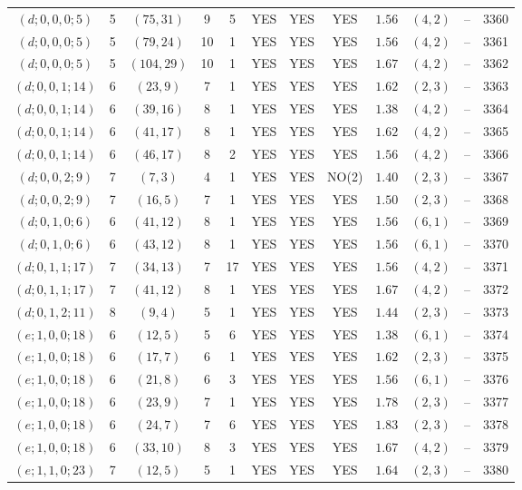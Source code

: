 \begin{longtable}{|c|c|c|c|c|c|c|c|c|c|c|c|}
$(d;0,0,0;5)$ & 5 & $(75,31)$ & 9 & 5 & YES & YES & YES & $1.56$ & $(4,2)$ & -- & 3360\\
$(d;0,0,0;5)$ & 5 & $(79,24)$ & 10 & 1 & YES & YES & YES & $1.56$ & $(4,2)$ & -- & 3361\\
$(d;0,0,0;5)$ & 5 & $(104,29)$ & 10 & 1 & YES & YES & YES & $1.67$ & $(4,2)$ & -- & 3362\\
$(d;0,0,1;14)$ & 6 & $(23,9)$ & 7 & 1 & YES & YES & YES & $1.62$ & $(2,3)$ & -- & 3363\\
$(d;0,0,1;14)$ & 6 & $(39,16)$ & 8 & 1 & YES & YES & YES & $1.38$ & $(4,2)$ & -- & 3364\\
$(d;0,0,1;14)$ & 6 & $(41,17)$ & 8 & 1 & YES & YES & YES & $1.62$ & $(4,2)$ & -- & 3365\\
$(d;0,0,1;14)$ & 6 & $(46,17)$ & 8 & 2 & YES & YES & YES & $1.56$ & $(4,2)$ & -- & 3366\\
$(d;0,0,2;9)$ & 7 & $(7,3)$ & 4 & 1 & YES & YES & NO(2) & $1.40$ & $(2,3)$ & -- & 3367\\
$(d;0,0,2;9)$ & 7 & $(16,5)$ & 7 & 1 & YES & YES & YES & $1.50$ & $(2,3)$ & -- & 3368\\
$(d;0,1,0;6)$ & 6 & $(41,12)$ & 8 & 1 & YES & YES & YES & $1.56$ & $(6,1)$ & -- & 3369\\
$(d;0,1,0;6)$ & 6 & $(43,12)$ & 8 & 1 & YES & YES & YES & $1.56$ & $(6,1)$ & -- & 3370\\
$(d;0,1,1;17)$ & 7 & $(34,13)$ & 7 & 17 & YES & YES & YES & $1.56$ & $(4,2)$ & -- & 3371\\
$(d;0,1,1;17)$ & 7 & $(41,12)$ & 8 & 1 & YES & YES & YES & $1.67$ & $(4,2)$ & -- & 3372\\
$(d;0,1,2;11)$ & 8 & $(9,4)$ & 5 & 1 & YES & YES & YES & $1.44$ & $(2,3)$ & -- & 3373\\
$(e;1,0,0;18)$ & 6 & $(12,5)$ & 5 & 6 & YES & YES & YES & $1.38$ & $(6,1)$ & -- & 3374\\
$(e;1,0,0;18)$ & 6 & $(17,7)$ & 6 & 1 & YES & YES & YES & $1.62$ & $(2,3)$ & -- & 3375\\
$(e;1,0,0;18)$ & 6 & $(21,8)$ & 6 & 3 & YES & YES & YES & $1.56$ & $(6,1)$ & -- & 3376\\
$(e;1,0,0;18)$ & 6 & $(23,9)$ & 7 & 1 & YES & YES & YES & $1.78$ & $(2,3)$ & -- & 3377\\
$(e;1,0,0;18)$ & 6 & $(24,7)$ & 7 & 6 & YES & YES & YES & $1.83$ & $(2,3)$ & -- & 3378\\
$(e;1,0,0;18)$ & 6 & $(33,10)$ & 8 & 3 & YES & YES & YES & $1.67$ & $(4,2)$ & -- & 3379\\
$(e;1,1,0;23)$ & 7 & $(12,5)$ & 5 & 1 & YES & YES & YES & $1.64$ & $(2,3)$ & -- & 3380\\

\end{longtable}

